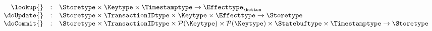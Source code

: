 
\[
  \begin{array}{rcl}
    \lookup{}   & : & \Storetype
                      \times \Keytype
                      \times \Timestamptype 
                      \rightarrow \Effecttype_{\bottom}\\
    \doUpdate{} & : & \Storetype
                      \times \TransactionIDtype
                      \times \Keytype
                      \times \Effecttype 
                      \rightarrow \Storetype \\
    \doCommit{} & : & \Storetype
                      \times \TransactionIDtype
                      \times \mathcal{P}(\Keytype)
                      \times \mathcal{P}(\Keytype)
                      \times \Statebuftype
                      \times \Timestamptype
                      \rightarrow \Storetype\\
  \end{array}
\]


